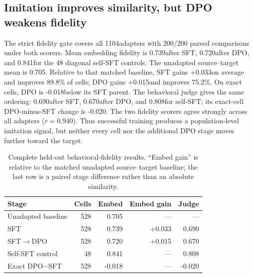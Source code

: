 \documentclass[letterpaper]{article}
\newcommand{\CampaignAdaptersPerStage}{528}
\newcommand{\FidelityAdapters}{1104}
\newcommand{\SelfSFTAdapters}{48}
\newcommand{\SFTEmbedFidelity}{0.739}
\newcommand{\DPOEmbedFidelity}{0.720}
\newcommand{\SelfSFTEmbedFidelity}{0.841}
\newcommand{\SFTJudgeFidelity}{0.690}
\newcommand{\DPOJudgeFidelity}{0.670}
\newcommand{\SelfSFTJudgeFidelity}{0.808}
\newcommand{\SFTEmbedGain}{+0.033}
\newcommand{\DPOEmbedGain}{+0.015}
\newcommand{\SFTEmbedGainPositivePct}{89.8}
\newcommand{\DPOEmbedGainPositivePct}{75.2}
\newcommand{\DPOminusSFTEmbedFidelity}{-0.018}
\newcommand{\DPOminusSFTJudgeFidelity}{-0.020}
\newcommand{\FidelityScorerCorrelation}{0.940}
\newcommand{\PairedStageCells}{528}
\begin{document}
\subsection{Imitation improves similarity, but DPO weakens fidelity}

The strict fidelity gate covers all \FidelityAdapters adapters with 200/200 parsed
comparisons under both scorers. Mean embedding fidelity is \SFTEmbedFidelity after SFT,
\DPOEmbedFidelity after DPO, and \SelfSFTEmbedFidelity for the 48 diagonal self-SFT
controls. The unadapted source--target mean is 0.705. Relative to that matched baseline,
SFT gains \SFTEmbedGain on average and improves \SFTEmbedGainPositivePct\% of cells;
DPO gains \DPOEmbedGain and improves \DPOEmbedGainPositivePct\%. On exact cells, DPO
is \DPOminusSFTEmbedFidelity below its SFT parent. The behavioral judge gives the same
ordering: \SFTJudgeFidelity after SFT, \DPOJudgeFidelity after DPO, and
\SelfSFTJudgeFidelity for self-SFT; its exact-cell DPO-minus-SFT change is
\DPOminusSFTJudgeFidelity. The two fidelity scorers agree strongly across all adapters
($r=\FidelityScorerCorrelation$). Thus successful training produces a population-level imitation signal,
but neither every cell nor the additional DPO stage moves further toward the target.

\begin{table}[t]
\centering
\small
\setlength{\tabcolsep}{3pt}
\begin{tabular}{lrrrr}
\toprule
Stage & Cells & Embed & Embed gain & Judge \\
\midrule
Unadapted baseline & 528 & 0.705 & --- & --- \\
SFT & \CampaignAdaptersPerStage & \SFTEmbedFidelity & \SFTEmbedGain & \SFTJudgeFidelity \\
SFT$\rightarrow$DPO & \CampaignAdaptersPerStage & \DPOEmbedFidelity & \DPOEmbedGain & \DPOJudgeFidelity \\
Self-SFT control & \SelfSFTAdapters & \SelfSFTEmbedFidelity & --- & \SelfSFTJudgeFidelity \\
Exact DPO$-$SFT & \PairedStageCells & \DPOminusSFTEmbedFidelity & --- & \DPOminusSFTJudgeFidelity \\
\bottomrule
\end{tabular}
\caption{Complete held-out behavioral-fidelity results. ``Embed gain'' is relative
to the matched unadapted source--target baseline; the last row is a paired stage
difference rather than an absolute similarity.}
\label{tab:fidelity}
\end{table}
\end{document}
